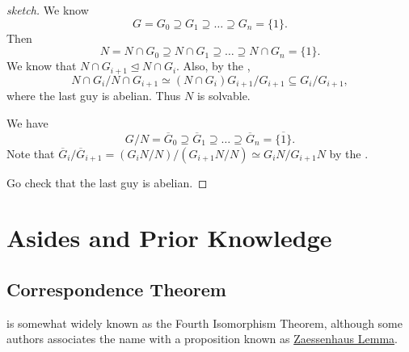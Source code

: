 \documentclass[notoc,notitlepage,nobib]{tufte-book}
\begin{document}
\begin{proof}[sketch]
  We know
  \begin{equation*}
    G = G_0 \supseteq G_1 \supseteq \hdots \supseteq G_n =\{1\}.
  \end{equation*}
  Then
  \begin{equation*}
    N = N \cap G_0 \supseteq N \cap G_1 \supseteq \hdots \supseteq N \cap G_n =
    \{ 1 \}.
  \end{equation*}
  We know that $N \cap G_{i+1} \trianglelefteq N \cap G_i$. Also, by the
   ,
  \begin{equation*}
    N \cap G_i / N \cap G_{i+1} \simeq (N \cap G_i) G_{i+1} / G_{i+1} \subseteq
    G_i / G_{i+1},
  \end{equation*}
  where the last guy is abelian. Thus $N$ is solvable.

  We have
  \begin{equation*}
    G / N = \overline{G}_0 \supseteq \overline{G}_1 \supseteq \hdots
    \supseteq \overline{G}_n = \overline{\{1\}}.
  \end{equation*}
  Note that $\overline{G}_i / \overline{G}_{i+1} = \left( G_i N / N \right) /
  \left( G_{i+1} N / N \right) \simeq G_i N / G_{i+1} N$ by the .

  Go check that the last guy is abelian.
\end{proof}




\appendix

\chapter{Asides and Prior Knowledge}%
\label{chp:asides_and_prior_knowledge}

\section{Correspondence Theorem}%
\label{sec:correspondence_theorem}

 is somewhat widely known 
as the Fourth Isomorphism Theorem, although some authors associates
the name with a proposition known as 
\href{https://en.wikipedia.org/wiki/Zassenhaus_lemma}{Zaessenhaus Lemma}.
\end{document}
